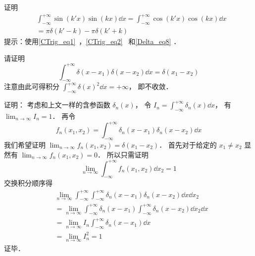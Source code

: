 \begin{exercise}{}
证明
\begin{equation}\label{Delta_eq9}
\begin{aligned}%
&\int_{-\infty}^{+\infty} \sin(k'x) \sin(kx) \dd{x} = \int_{-\infty}^{+\infty} \cos(k'x) \cos(kx) \dd{x}\\
&= \pi\delta(k' - k) - \pi\delta(k' + k)
\end{aligned}
\end{equation}
提示：使用\autoref{CTrig_eq1}~，\autoref{CTrig_eq2}~ 和\autoref{Delta_eq8} ．
\end{exercise}

\begin{example}{}
请证明
\begin{equation}
\int_{-\infty}^{+\infty} \delta(x-x_1) \delta(x-x_2) \dd{x} = \delta(x_1 - x_2)
\end{equation}
注意由此可得积分 $\int_{-\infty}^{+\infty}\delta(x)^2 \dd{x} = +\infty$， 即不收敛．

证明： 考虑和上文一样的含参函数 $\delta_n(x)$， 令 $I_n = \int_{-\infty}^{+\infty} \delta_n(x) \dd{x}$， 有 $\lim_{n\to\infty} I_n = 1$． 再令
\begin{equation}
f_n(x_1, x_2) = \int_{-\infty}^{+\infty} \delta_n(x-x_1) \delta_n(x-x_2) \dd{x}
\end{equation}
我们希望证明 $\lim_{n\to\infty }f_n(x_1, x_2) = \delta(x_1 - x_2)$． 首先对于给定的 $x_1 \ne x_2$ 显然有 $\lim_{n\to\infty }f_n(x_1, x_2) = 0$． 所以只需证明
\begin{equation}
\lim_{n\to\infty }\int_{-\infty}^{+\infty} f_n(x_1, x_2) \dd{x_2} = 1
\end{equation}
交换积分顺序得
\begin{equation}
\begin{aligned}
&\lim_{n\to\infty }\int_{-\infty}^{+\infty}\int_{-\infty}^{+\infty} \delta_n(x-x_1) \delta_n(x-x_2) \dd{x}\dd{x_2}\\
&= \lim_{n\to\infty }\int_{-\infty}^{+\infty} \delta_n(x-x_1) \int_{-\infty}^{+\infty} \delta_n(x-x_2)\dd{x_2} \dd{x}\\
&= \lim_{n\to\infty } I_n \int_{-\infty}^{+\infty} \delta_n(x-x_1)\dd{x}\\
&= \lim_{n\to\infty } I_n^2 = 1
\end{aligned}
\end{equation}
证毕．
\end{example}
